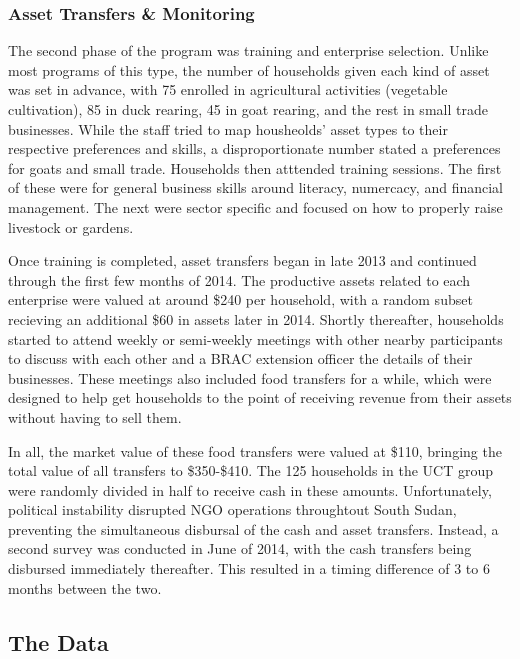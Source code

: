 \documentclass[12pt,article]{article}
\begin{document}
\subsubsection{Asset Transfers \& Monitoring}
\label{sec:orgheadline3}

The second phase of the program was training and enterprise selection. Unlike most
programs of this type, the number of households given each kind of asset was set in
advance, with 75 enrolled in agricultural activities (vegetable cultivation), 85 in
duck rearing, 45 in goat rearing, and the rest in small trade businesses. While the
staff tried to map housheolds' asset types to their respective preferences and
skills, a disproportionate number stated a preferences for goats and small trade.
Households then atttended training sessions. The first of these were for general
business skills around literacy, numercacy, and financial management. The next were
sector specific and focused on how to properly raise livestock or gardens. 

Once training is completed, asset transfers began in late 2013 and continued through
the first few months of 2014. The productive assets related to each enterprise were
valued at around \$240 per household, with a random subset recieving an additional \$60
in assets later in 2014. Shortly thereafter, households started to attend weekly or
semi-weekly meetings with other nearby participants to discuss with each other and a
BRAC extension officer the details of their businesses. These meetings also included
food transfers for a while, which were designed to help get households to the point
of receiving revenue from their assets without having to sell them.

In all, the market value of these food transfers were valued at \$110, bringing the
total value of all transfers to \$350-\$410. The 125 households in the UCT group were
randomly divided in half to receive cash in these amounts. Unfortunately, political
instability disrupted NGO operations throughtout South Sudan, preventing the
simultaneous disbursal of the cash and asset transfers. Instead, a second survey was
conducted in June of 2014, with the cash transfers being disbursed immediately
thereafter. This resulted in a timing difference of 3 to 6 months between the two.

\subsection{The Data}
\label{sec:orgheadline4}
\end{document}
